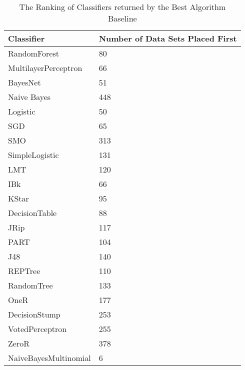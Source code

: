 \begin{table}[h]
\centering
	\begin{tabularx}{\textwidth}{X | X}
		Classifier				&	Number of Data Sets Placed First \\	\hline
		RandomForest				&	80								\\	\hline
		MultilayerPerceptron		&	66								\\	\hline
		BayesNet					&	51								\\	\hline
		Naive Bayes				&	448								\\	\hline	
		Logistic					&	50								\\	\hline	
		SGD						&	65								\\	\hline
		SMO						&	313								\\	\hline
		SimpleLogistic			&	131								\\	\hline
		LMT						&	120								\\	\hline	
		IBk						&	66								\\	\hline	
		KStar					&	95								\\	\hline	
		DecisionTable			&	88								\\	\hline
		JRip						&	117								\\	\hline
		PART						&	104								\\	\hline
		J48						&	140								\\	\hline	
		REPTree					&	110								\\	\hline
		RandomTree				&	133								\\	\hline	
		OneR						&	177								\\	\hline						
		DecisionStump			&	253								\\	\hline
		VotedPerceptron			&	255								\\	\hline	
		ZeroR					&	378								\\	\hline	
		NaiveBayesMultinomial	&	6								\\	\hline	
	\end{tabularx}
	\label{tab:bestAglorithmRanking}
	\caption{The Ranking of Classifiers returned by the Best Algorithm Baseline}
\end{table}